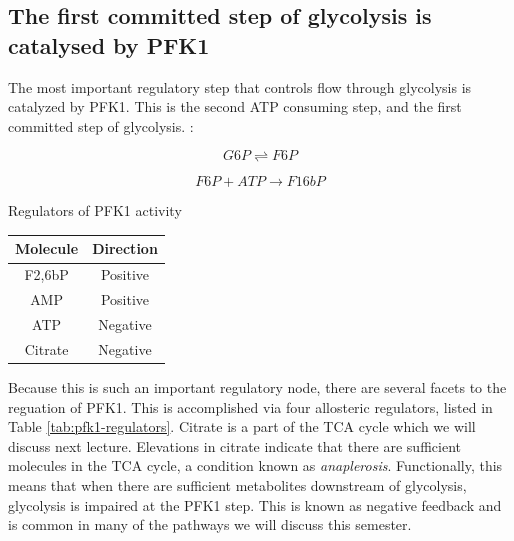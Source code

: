 \documentclass{tufte-handout}
\begin{document}
\subsection{The first committed step of glycolysis is catalysed by PFK1}

The most important regulatory step that controls flow through glycolysis is catalyzed by PFK1.  This is the second ATP consuming step, and the first committed step of glycolysis.  :

\begin{equation}\label{eq:pgm}
G6P \rightleftharpoons F6P
\end{equation}

\begin{equation}\label{eq:pfk1}
F6P + ATP \rightarrow F16bP
\end{equation}

\begin{margintable}
\centering
\caption{Regulators of PFK1 activity}
\label{tab:pfk1-regulators}
\begin{tabular}{cc}
\hline
\textbf {Molecule} & \textbf{Direction}  \\
\hline
F2,6bP & Positive \\
AMP & Positive \\
ATP & Negative \\
Citrate & Negative \\
\hline
\end{tabular}
\end{margintable}

Because this is such an important regulatory node, there are several facets to the reguation of PFK1.  This is accomplished via four allosteric regulators, listed in Table \ref{tab:pfk1-regulators}.  Citrate is a part of the TCA cycle which we will discuss next lecture.  Elevations in citrate indicate that there are sufficient molecules in the TCA cycle, a condition known as \emph{anaplerosis}.  Functionally, this means that when there are sufficient metabolites downstream of glycolysis, glycolysis is impaired at the PFK1 step.  This is known as negative feedback and is common in many of the pathways we will discuss this semester.
\end{document}

